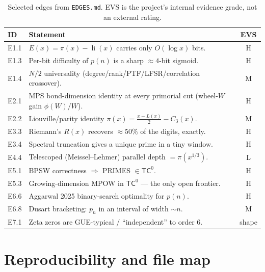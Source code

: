 \documentclass[11pt]{article}
\theoremstyle{plain}
\theoremstyle{definition}
\theoremstyle{remark}
\DeclareMathOperator{\li}{li}
\newcommand{\TC}{\mathsf{TC}^{0}}
\begin{document}
\begin{table}[h]
\centering
\footnotesize
\begin{tabular}{@{}l p{10.4cm} c@{}}
\toprule
\textbf{ID} & \textbf{Statement} & \textbf{EVS}\\
\midrule
E1.1 & $E(x)=\pi(x)-\li(x)$ carries only $O(\log x)$ bits. & H \\
E1.3 & Per-bit difficulty of $p(n)$ is a sharp ${\approx}4$-bit sigmoid. & H \\
E1.4 & $N/2$ universality (degree/rank/PTF/LFSR/correlation crossover). & M \\
E2.1 & MPS bond-dimension identity at every primorial cut (wheel-$W$ gain $\phi(W)/W$). & H \\
E2.2 & Liouville/parity identity $\pi(x)=\tfrac{x-L(x)}{2}-C_3(x)$. & M \\
E3.3 & Riemann's $R(x)$ recovers ${\approx}50\%$ of the digits, exactly. & H \\
E3.4 & Spectral truncation gives a unique prime in a tiny window. & H \\
E4.4 & Telescoped (Meissel--Lehmer) parallel depth $=\pi(x^{1/3})$. & L \\
E5.1 & BPSW correctness $\Rightarrow$ PRIMES $\in\TC$. & H \\
E5.3 & Growing-dimension MPOW in $\TC$ --- the only open frontier. & H \\
E6.6 & Aggarwal 2025 binary-search optimality for $p(n)$. & H \\
E6.8 & Dusart bracketing: $p_n$ in an interval of width ${\sim}n$. & M \\
E7.1 & Zeta zeros are GUE-typical / ``independent'' to order $6$. & shape \\
\bottomrule
\end{tabular}
\caption{Selected edges from \texttt{EDGES.md}. \textsf{EVS} is the project's
internal evidence grade, not an external rating.}
\label{tab:edges}
\end{table}

\section{Reproducibility and file map}
\label{app:repro}
\end{document}
